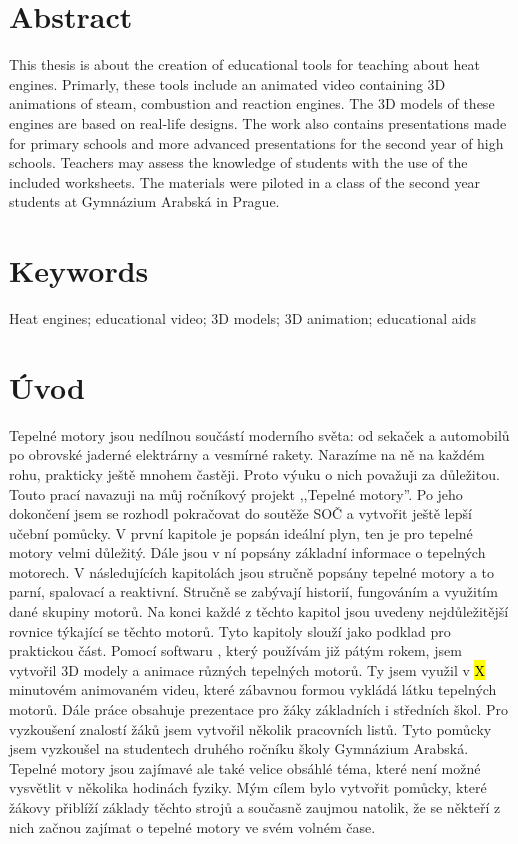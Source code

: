 \section*{Abstract}
{This thesis is about the creation of educational tools for teaching about heat engines. Primarly, these tools include an animated video containing 3D animations of steam, combustion and reaction engines. The 3D models of these engines are based on real-life designs. The work also contains presentations made for primary schools and more advanced presentations for the second year of high schools. Teachers may assess the knowledge of students with the use of the included worksheets. The materials were piloted in a class of the second year students at Gymnázium Arabská in Prague.}

\section*{Keywords}
{Heat engines; educational video; 3D models; 3D animation; educational aids}

\newpage

\tableofcontents


\newpage
\pagestyle{plain}

\section{Úvod}
{Tepelné motory jsou nedílnou součástí moderního světa: od sekaček a automobilů po obrovské jaderné elektrárny a vesmírné rakety. Narazíme na ně na každém rohu, prakticky ještě mnohem častěji. Proto výuku o nich považuji za důležitou. Touto prací navazuji na můj ročníkový projekt ,,Tepelné motory”. Po jeho dokončení jsem se rozhodl pokračovat do soutěže SOČ a vytvořit ještě lepší učební pomůcky.}\odst
{V první kapitole je popsán ideální plyn, ten je pro tepelné motory velmi důležitý. Dále jsou v ní popsány základní informace o tepelných motorech. V následujících kapitolách jsou stručně popsány tepelné motory a to parní, spalovací a reaktivní. Stručně se zabývají historií, fungováním a využitím dané skupiny motorů. Na konci každé z těchto kapitol jsou uvedeny nejdůležitější rovnice týkající se těchto motorů. Tyto kapitoly slouží jako podklad pro praktickou část.}\odst
{Pomocí softwaru , který používám již pátým rokem, jsem vytvořil 3D modely a animace různých tepelných motorů. Ty jsem využil v \hl{X} minutovém animovaném videu, které zábavnou formou vykládá látku tepelných motorů. Dále práce obsahuje prezentace pro žáky základních i středních škol. Pro vyzkoušení znalostí žáků jsem vytvořil několik pracovních listů. Tyto pomůcky jsem vyzkoušel na studentech druhého ročníku školy Gymnázium Arabská.}\odst
{Tepelné motory jsou zajímavé ale také velice obsáhlé téma, které není možné vysvětlit v několika hodinách fyziky. Mým cílem bylo vytvořit pomůcky, které žákovy přiblíží základy těchto strojů a současně zaujmou natolik, že se někteří z nich začnou zajímat o tepelné motory ve svém volném čase.}